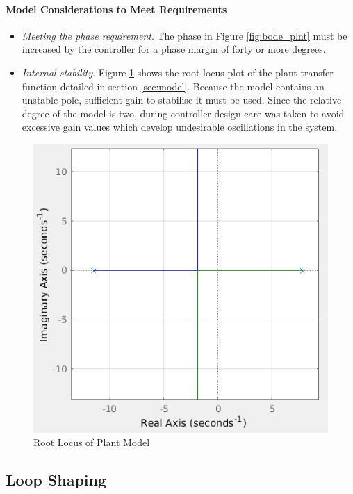 \documentclass[11pt, a4paper,twocolumn]{article}
\begin{document}
	\paragraph{		Model Considerations to Meet Requirements }
		
	\begin{itemize}
		\item \textit{Meeting the phase requirement}. The phase in Figure \ref{fig:bode_plnt} must be increased by the controller for a phase margin of forty or more degrees.
		\item \textit{Internal stability}. Figure \ref{fig:rl_plnt} shows the root locus plot of the plant transfer function detailed in section \ref{sec:model}. Because the model contains an unstable pole, sufficient gain to stabilise it must be used. Since the relative degree of the model is two, during controller design care was taken to avoid excessive gain values which develop undesirable oscillations in the system.
	\end{itemize}				
		
		\begin{figure}[h!]
			\centering
			\includegraphics[scale=0.4]{rlocus_plant}
			\caption{Root Locus of Plant Model}
			\label{fig:rl_plnt}
		\end{figure}
						
			
	\subsection{		Loop Shaping\\		}
\end{document}
